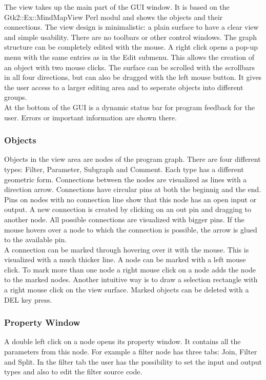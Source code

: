 \documentclass[journal]{IEEEtran}
\begin{document}
The view takes up the main part of the GUI window. It is based on the Gtk2::Ex::MindMapView
Perl modul \cite{GTK2EXMindMapView} and shows the objects and their connections. The view design
is minimalistic: a plain surface to have a clear view and simple usability.
There are no toolbars or other control windows. The graph structure
can be completely edited with the mouse. A right click opens a pop-up menu with the
same entries as in the Edit submenu. This allows the creation of an object with two mouse
clicks. The surface can be scrolled with the scrollbars in all four directions,
but can also be dragged with the left mouse button. It gives the user access to a larger
editing area and to seperate objects into different groups. \\

At the bottom of the GUI is a dynamic status bar for program feedback for the user.
Errors or important information are shown there. \\

\subsubsection{Objects}
Objects in the view area are nodes of the program graph. There
are four different types: Filter, Parameter, Subgraph and Comment. Each type has
a different geometric form. Connections between the nodes are visualized as lines
with a direction arrow. Connections have circular pins at both the beginnig and the end.
Pins on nodes with no connection line show that this node has an open input or output.
A new connection is created by clicking on an out pin and dragging to another node.
All possible connections are visualized with bigger pins. If the mouse hovers over a
node to which the connection is possible, the arrow is glued to the available pin. \\

A connection can be marked through hovering over it with the mouse. This is visualized with a much
thicker line. A node can be marked with a left mouse click. To mark more than one
node a right mouse click on a node adds the node to the marked nodes. Another intuitive
way is to draw a selection rectangle with a right mouse click on the view surface.
Marked objects can be deleted with a DEL key press. \\

\subsubsection{Property Window}
A double left click on a node opens its property window. It contains all the parameters
from this node. For example a filter node has three tabs: Join, Filter and Split.
In the filter tab the user has the possibility to set the input and output types and
also to edit the filter source code.
\end{document}
